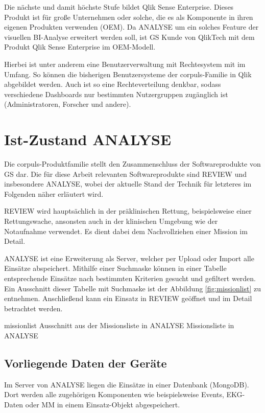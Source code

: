 Die nächste und damit höchste Stufe bildet Qlik Sense Enterprise.
Dieses Produkt ist für große Unternehmen oder solche, die es als Komponente in ihren eigenen Produkten verwenden (\gls{OEM}).
Da \gls{ANALYSE} um ein solches Feature der visuellen \gls{BI}-Analyse erweitert werden soll, ist \gls{GS} Kunde von QlikTech mit dem Produkt Qlik Sense Enterprise im \gls{OEM}-Modell.

Hierbei ist unter anderem eine Benutzerverwaltung mit Rechtesystem mit im Umfang.
So können die bisherigen Benutzersysteme der  \textsf{corpuls\color{corpulsred}{.web}}-Familie in Qlik abgebildet werden.
Auch ist so eine Rechteverteilung denkbar, sodass verschiedene Dashboards nur bestimmten Nutzergruppen zugänglich ist (Administratoren, Forscher und andere).


\section{Ist-Zustand \acrlong*{ANALYSE}}
\label{sec:istAnalyse}
Die \textsf{corpuls\color{corpulsred}{.web}}-Produktfamilie stellt den Zusammenschluss der Softwareprodukte von \gls{GS} dar.
Die für diese Arbeit relevanten Softwareprodukte sind \gls{REVIEW} und insbesondere \acrfull{ANALYSE}, wobei der aktuelle Stand der Technik für letzteres im Folgenden näher erläutert wird.

\gls{REVIEW} wird hauptsächlich in der präklinischen Rettung, beispielsweise einer Rettungswache, ansonsten auch in der klinischen Umgebung wie der Notaufnahme verwendet.
Es dient dabei dem Nachvollziehen einer Mission im Detail.

\gls{ANALYSE} ist eine Erweiterung als Server, welcher per Upload oder Import alle Einsätze abspeichert. 
Mithilfe einer Suchmaske können in einer Tabelle entsprechende Einsätze nach bestimmten Kriterien gesucht und gefiltert werden.
Ein Ausschnitt dieser Tabelle mit Suchmaske ist der Abbildung \ref{fig:missionlist} zu entnehmen.
Anschließend kann ein Einsatz in \gls{REVIEW} geöffnet und im Detail betrachtet werden.

\bildbreit
{missionlist}
{Ausschnitt aus der \glqq Missionsliste\grqq{} in \acrlong*{ANALYSE}}
{Missionsliste in \acrlong*{ANALYSE}}


\subsection{Vorliegende Daten der Geräte}
Im Server von \gls{ANALYSE} liegen die Einsätze in einer Datenbank (MongoDB).
Dort werden alle zugehörigen Komponenten wie beispielsweise Events, \gls{EKG}-Daten oder \gls{MM} in einem Einsatz-Objekt abgespeichert.

